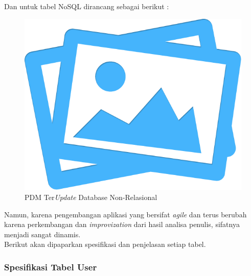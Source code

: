 	Dan untuk tabel NoSQL dirancang sebagai berikut :
	\begin{figure}[H]
		\centering
		\includegraphics[width=\textwidth]{images/no-image.png}
		\caption{PDM Ter\textit{Update} Database Non-Relasional}
		\label{pdm-nosql-final}
	\end{figure}
	
	Namun, karena pengembangan aplikasi yang bersifat \textit{agile} dan terus berubah karena perkembangan dan \textit{improvization} dari hasil analisa penulis, sifatnya menjadi sangat dinamis.\\

	Berikut akan dipaparkan spesifikasi dan penjelasan setiap tabel.
	\subsubsection{Spesifikasi Tabel User}
	
